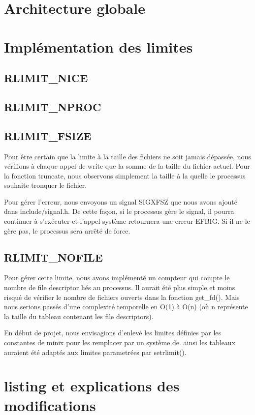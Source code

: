 \documentclass[9pt , a4paper]{report}
\begin{document}
	\section{Architecture globale}
	\section{Implémentation des limites}
	\subsection{RLIMIT\_NICE}
	\subsection{RLIMIT\_NPROC}
	\subsection{RLIMIT\_FSIZE}
	Pour être certain que la limite à la taille des fichiers ne soit jamais dépassée, nous vérifions à chaque appel de write que la somme de la taille du fichier actuel. Pour la fonction truncate, nous observons simplement la taille à la quelle le processus souhaite tronquer le fichier. 
	
	Pour gérer l'erreur, nous envoyons un signal SIGXFSZ que nous avons ajouté dans include/signal.h. De cette façon, si le processus gère le signal, il pourra continuer à s'exécuter et l'appel système retournera une erreur EFBIG. Si il ne le gère pas, le processus sera arrêté de force.

	\subsection{RLIMIT\_NOFILE}
	
	Pour gérer cette limite, nous avons implémenté un compteur qui compte le nombre de file descriptor liés au processus.  Il aurait été plus simple et moins risqué de vérifier le nombre de fichiers ouverts dans la fonction get\_fd(). Mais nous serions passés d'une complexité temporelle en O(1) à O(n) (où n représente la taille du tableau contenant les file descriptors). 
	
	En début de projet, nous envisagions d'enlevé les limites définies par les constantes de minix pour les remplacer par un système de. ainsi les tableaux auraient été adaptés aux limites parametrées par setrlimit().  
	
	\section{listing et explications des modifications}
	
\end{document}
